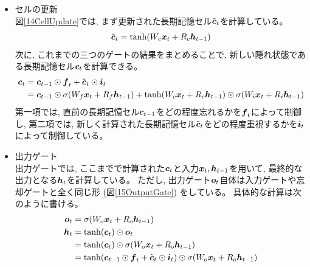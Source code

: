 \begin{itemize}
  \item セルの更新\\
  図\ref{14CellUpdate}では, まず更新された長期記憶セル$\tilde{{\mbox{\boldmath{$c$}}}}_t$を計算している。
\begin{equation}
 \begin{split}
  \tilde{{\mbox{\boldmath{$c$}}}}_t = \tanh (W_c {\mbox{\boldmath{$x$}}}_t + R_c {\mbox{\boldmath{$h$}}}_{t-1})
 \end{split}
\end{equation} 
  次に, これまでの三つのゲートの結果をまとめることで, 新しい隠れ状態である長期記憶セル${\mbox{\boldmath{$c$}}}_{t}$を計算できる。
\begin{equation}
 \begin{split}
  {\mbox{\boldmath{$c$}}}_{t} 
  &= {\mbox{\boldmath{$c$}}}_{t-1} \odot  {\mbox{\boldmath{$f$}}}_{t} + \tilde{\mbox{\boldmath{$c$}}}_{t}\odot {\mbox{\boldmath{$i$}}}_{t}\\
  &= {\mbox{\boldmath{$c$}}}_{t-1} \odot  \sigma (W_f {\mbox{\boldmath{$x$}}}_t + R_f {\mbox{\boldmath{$h$}}}_{t-1}) 
  + \tanh (W_c {\mbox{\boldmath{$x$}}}_t + R_c {\mbox{\boldmath{$h$}}}_{t-1}) \odot \sigma (W_i {\mbox{\boldmath{$x$}}}_t + R_i {\mbox{\boldmath{$h$}}}_{t-1})
 \end{split}
\end{equation}
  第一項では, 直前の長期記憶セル${\mbox{\boldmath{$c$}}}_{t-1}$をどの程度忘れるかを${\mbox{\boldmath{$f$}}}_{t}$によって制御し, 第二項では, 新しく計算された長期記憶セル$\tilde{\mbox{\boldmath{$c$}}}_{t}$をどの程度重視するかを${\mbox{\boldmath{$i$}}}_{t}$によって制御している。
    
  \item 出力ゲート\\
  出力ゲートでは, ここまでで計算された${\mbox{\boldmath{$c$}}}_{t}$と入力${\mbox{\boldmath{$x$}}}_t, {\mbox{\boldmath{$h$}}}_{t-1}$を用いて, 最終的な出力となる${\mbox{\boldmath{$h$}}}_{t}$を計算している。
  ただし, 出力ゲート${\mbox{\boldmath{$o$}}}_{t}$自体は入力ゲートや忘却ゲートと全く同じ形 (図\ref{15OutputGate}) をしている。
  具体的な計算は次のように書ける。
\begin{equation}
 \begin{split}
  {\mbox{\boldmath{$o$}}}_{t} 
  &= \sigma (W_o {\mbox{\boldmath{$x$}}}_t + R_o {\mbox{\boldmath{$h$}}}_{t-1})\\
  {\mbox{\boldmath{$h$}}}_{t} 
  &= \tanh({\mbox{\boldmath{$c$}}}_{t}) \odot  {\mbox{\boldmath{$o$}}}_{t}\\
  &= \tanh({\mbox{\boldmath{$c$}}}_{t}) \odot  \sigma (W_o {\mbox{\boldmath{$x$}}}_t + R_o {\mbox{\boldmath{$h$}}}_{t-1})\\
  &= \tanh({\mbox{\boldmath{$c$}}}_{t-1} \odot  {\mbox{\boldmath{$f$}}}_{t} + \tilde{\mbox{\boldmath{$c$}}}_{t}\odot {\mbox{\boldmath{$i$}}}_{t}) \odot  \sigma (W_o {\mbox{\boldmath{$x$}}}_t + R_o {\mbox{\boldmath{$h$}}}_{t-1})
 \end{split}
\end{equation}
\end{itemize}

